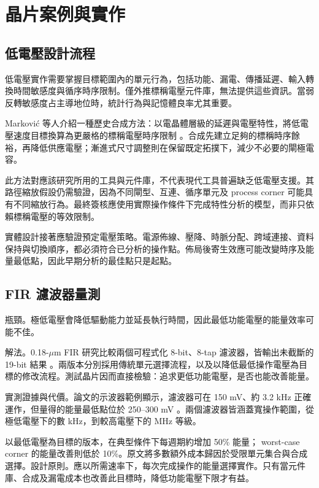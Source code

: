\chapter{晶片案例與實作}
\label{ch:cases}
\section{低電壓設計流程}
低電壓實作需要掌握目標範圍內的單元行為，包括功能、漏電、傳播延遲、輸入轉換時間敏感度與循序時序限制。僅外推標稱電壓元件庫，無法提供這些資訊。當弱反轉敏感度占主導地位時，統計行為與記憶體良率尤其重要。

Markovi\'{c} 等人介紹一種歷史合成方法：以電晶體層級的延遲與電壓特性，將低電壓速度目標換算為更嚴格的標稱電壓時序限制 \cite[Sec.~VII]{markovic2010}。合成先建立足夠的標稱時序餘裕，再降低供應電壓；漸進式尺寸調整則在保留既定拓撲下，減少不必要的閘極電容。

此方法對應該研究所用的工具與元件庫，不代表現代工具普遍缺乏低電壓支援。其路徑縮放假設仍需驗證，因為不同閘型、互連、循序單元及 process corner 可能具有不同縮放行為。最終簽核應使用實際操作條件下完成特性分析的模型，而非只依賴標稱電壓的等效限制。

實體設計接著應驗證預定電壓策略。電源佈線、壓降、時脈分配、跨域連接、資料保持與切換順序，都必須符合已分析的操作點。佈局後寄生效應可能改變時序及能量最低點，因此早期分析的最佳點只是起點。

\section{FIR 濾波器量測}
\textnormal{瓶頸。}極低電壓會降低驅動能力並延長執行時間，因此最低功能電壓的能量效率可能不佳。

\textnormal{解法。}0.18-$\mu$m FIR 研究比較兩個可程式化 8-bit、8-tap 濾波器，皆輸出未截斷的 19-bit 結果 \cite[Sec.~IV]{calhoun2005}。兩版本分別採用傳統單元選擇流程，以及以降低最低操作電壓為目標的修改流程。測試晶片因而直接檢驗：追求更低功能電壓，是否也能改善能量。

\textnormal{實測證據與代價。}論文的示波器範例顯示，濾波器可在 150 mV、約 3.2 kHz 正確運作，但量得的能量最低點位於 250--300 mV \cite[Figs.~10--12]{calhoun2005}。兩個濾波器皆涵蓋寬操作範圍，從極低電壓下的數 kHz，到較高電壓下的 MHz 等級。

以最低電壓為目標的版本，在典型條件下每週期約增加 50\% 能量； worst-case corner 的能量改善則低於 10\%。原文將多數額外成本歸因於受限單元集合與合成選擇。\textnormal{設計原則。}應以所需速率下，每次完成操作的能量選擇實作。只有當元件庫、合成及漏電成本也改善此目標時，降低功能電壓下限才有益。

